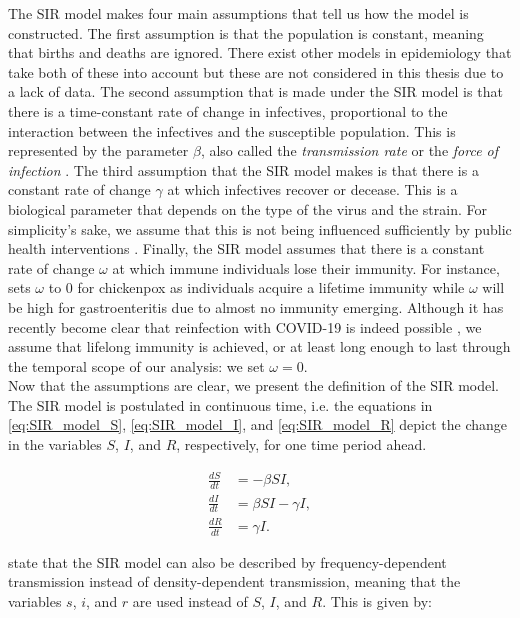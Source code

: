 \documentclass[12pt]{article}
\begin{document}
	The SIR model makes four main assumptions that tell us how the model is constructed. The first assumption is that the population is constant, meaning that births and deaths are ignored. There exist other models in epidemiology that take both of these into account but these are not considered in this thesis due to a lack of data. The second assumption that is made under the SIR model is that there is a time-constant rate of change in infectives, proportional to the interaction between the infectives and the susceptible population. This is represented by the parameter $\beta$, also called the \textit{transmission rate} or the \textit{force of infection} \parencite{keeling2011modeling}. The third assumption that the SIR model makes is that there is a constant rate of change $\gamma$ at which infectives recover or decease. This is a biological parameter that depends on the type of the virus and the strain. For simplicity's sake, we assume that this is not being influenced sufficiently by public health interventions \parencite{adda2016economic}. Finally, the SIR model assumes that there is a constant rate of change $\omega$ at which immune individuals lose their immunity. For instance, \textcite{adda2016economic} sets $\omega$ to 0 for chickenpox as individuals acquire a lifetime immunity while $\omega$ will be high for gastroenteritis due to almost no immunity emerging. Although it has recently become clear that reinfection with COVID-19 is indeed possible \parencite{bloomberg2020reinfection}, we assume that lifelong immunity is achieved, or at least long enough to last through the temporal scope of our analysis: we set $\omega = 0$. \\
	
	Now that the assumptions are clear, we present the definition of the SIR model. The SIR model is postulated in continuous time, i.e. the equations in \eqref{eq:SIR_model_S}, \eqref{eq:SIR_model_I}, and \eqref{eq:SIR_model_R} depict the change in the variables $S$, $I$, and $R$, respectively, for one time period ahead.
	
	\begin{align}
    	\frac{dS}{dt} &= -\beta SI, \label{eq:SIR_model_S}\\
    	\frac{dI}{dt} &= \beta SI - \gamma I, \label{eq:SIR_model_I}\\
    	\frac{dR}{dt} &= \gamma I. \label{eq:SIR_model_R}
	\end{align}
	
	\textcite{keeling2011modeling} state that the SIR model can also be described by frequency-dependent transmission instead of density-dependent transmission, meaning that the variables $s$, $i$, and $r$ are used instead of $S$, $I$, and $R$. This is given by:
	
\end{document}
